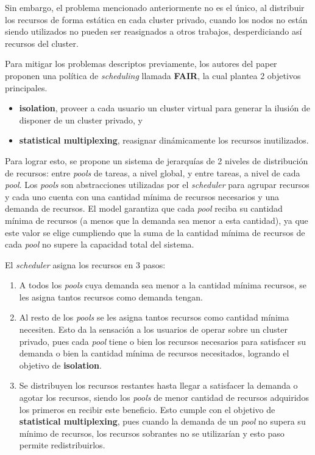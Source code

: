 \documentclass[a4paper]{article}
\begin{document}
Sin embargo, el problema mencionado anteriormente no es el único, al distribuir
los recursos de forma estática en cada cluster privado, cuando los nodos no
están siendo utilizados no pueden ser reasignados a otros trabajos,
desperdiciando así recursos del cluster.

Para mitigar los problemas descriptos previamente, los autores del paper
proponen una política de \textit{scheduling} llamada \textbf{FAIR}, la cual
plantea 2 objetivos principales.
\begin{itemize}
  \item \textbf{isolation}, proveer a cada usuario un cluster virtual para
  generar la ilusión de disponer de un cluster privado, y
	\item \textbf{statistical multiplexing}, reasignar dinámicamente los recursos
  inutilizados.
\end{itemize}

Para lograr esto, se propone un sistema de jerarquías de 2 niveles de
distribución de recursos: entre \textit{pools} de tareas, a nivel global, y
entre tareas, a nivel de cada \textit{pool}. Los \textit{pools} son
abstracciones utilizadas por el \textit{scheduler} para agrupar recursos y cada
uno cuenta con una cantidad mínima de recursos necesarios y una demanda de
recursos. El model garantiza que cada \textit{pool} reciba su cantidad mínima
de recursos (a menos que la demanda sea menor a esta cantidad), ya que este
valor se elige cumpliendo que la suma de la cantidad mínima de recursos de cada
\textit{pool} no supere la capacidad total del sistema.

El \textit{scheduler} asigna los recursos en 3 pasos:
\begin{enumerate}
	\item A todos los \textit{pools} cuya demanda sea menor a la cantidad mínima
  recursos, se les asigna tantos recursos como demanda tengan.
	\item Al resto de los \textit{pools} se les asigna tantos recursos como
  cantidad mínima necesiten. Esto da la sensación a los usuarios de operar
  sobre un cluster privado, pues cada \textit{pool} tiene o bien los recursos
  necesarios para satisfacer su demanda o bien la cantidad mínima de recursos
  necesitados, logrando el objetivo de \textbf{isolation}.
	\item Se distribuyen los recursos restantes hasta llegar a satisfacer la
  demanda o agotar los recursos, siendo los \textit{pools} de menor cantidad de
  recursos adquiridos los primeros en recibir este beneficio. Esto cumple con
  el objetivo de \textbf{statistical multiplexing}, pues cuando la demanda de
  un \textit{pool} no supera su mínimo de recursos, los recursos sobrantes no
  se utilizarían y esto paso permite redistribuirlos.
\end{enumerate}
\end{document}
